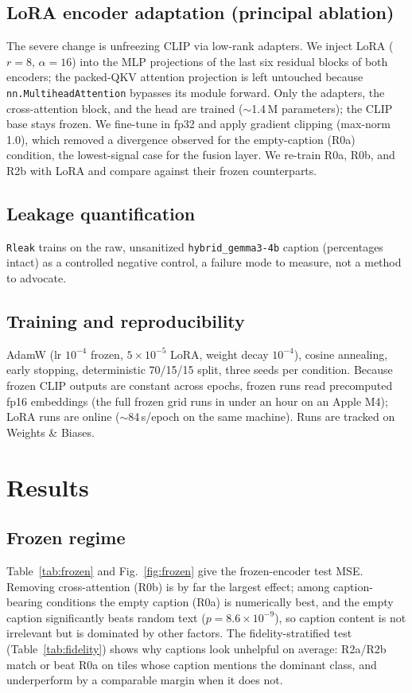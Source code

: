 \documentclass[conference]{IEEEtran}
\begin{document}
\subsection{LoRA encoder adaptation (principal ablation)}
The severe change is unfreezing CLIP via low-rank adapters. We inject
LoRA ($r{=}8$, $\alpha{=}16$) into the MLP projections of the last six
residual blocks of both encoders; the packed-QKV attention projection is left
untouched because \texttt{nn.MultiheadAttention} bypasses its module forward.
Only the adapters, the cross-attention block, and the head are trained
($\sim$1.4\,M parameters); the CLIP base stays frozen. We fine-tune in fp32 and
apply gradient clipping (max-norm 1.0), which removed a divergence observed for
the empty-caption (R0a) condition, the lowest-signal case for the fusion
layer. We re-train R0a, R0b, and R2b with LoRA and compare against their frozen
counterparts.

\subsection{Leakage quantification}
\texttt{Rleak} trains on the raw, unsanitized \texttt{hybrid\_gemma3-4b}
caption (percentages intact) as a controlled negative control, a failure
mode to measure, not a method to advocate.

\subsection{Training and reproducibility}
AdamW (lr $10^{-4}$ frozen, $5\!\times\!10^{-5}$ LoRA, weight decay $10^{-4}$),
cosine annealing, early stopping, deterministic 70/15/15 split, three seeds per
condition. Because frozen CLIP outputs are constant across epochs, frozen runs
read precomputed fp16 embeddings (the full frozen grid runs in under an hour on
an Apple M4); LoRA runs are online ($\sim$84\,s/epoch on the same machine).
Runs are tracked on Weights \& Biases.

\section{Results}

\subsection{Frozen regime}
Table~\ref{tab:frozen} and Fig.~\ref{fig:frozen} give the frozen-encoder test
MSE. Removing cross-attention (R0b) is by far the largest effect; among
caption-bearing conditions the empty caption (R0a) is numerically best, and
the empty caption significantly beats random text
($p{=}8.6\!\times\!10^{-9}$), so caption content is not irrelevant but is
dominated by other factors. The fidelity-stratified test
(Table~\ref{tab:fidelity}) shows why captions look unhelpful on average: R2a/R2b
match or beat R0a on tiles whose caption mentions the dominant class, and
underperform by a comparable margin when it does not.
\end{document}
